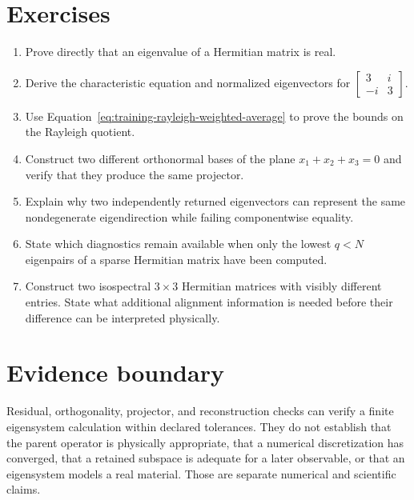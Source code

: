 \section{Exercises}

\begin{enumerate}
  \item Prove directly that an eigenvalue of a Hermitian matrix is real.
  \item Derive the characteristic equation and normalized eigenvectors for
        \(\begin{bmatrix}3&i\\-i&3\end{bmatrix}\).
  \item Use Equation~\eqref{eq:training-rayleigh-weighted-average} to prove the
        bounds on the Rayleigh quotient.
  \item Construct two different orthonormal bases of the plane
        \(x_1+x_2+x_3=0\) and verify that they produce the same projector.
  \item Explain why two independently returned eigenvectors can represent the
        same nondegenerate eigendirection while failing componentwise equality.
  \item State which diagnostics remain available when only the lowest \(q<N\)
        eigenpairs of a sparse Hermitian matrix have been computed.
  \item Construct two isospectral \(3\times3\) Hermitian matrices with visibly
        different entries. State what additional alignment information is
        needed before their difference can be interpreted physically.
\end{enumerate}

\section{Evidence boundary}

Residual, orthogonality, projector, and reconstruction checks can verify a
finite eigensystem calculation within declared tolerances. They do not
establish that the parent operator is physically appropriate, that a numerical
discretization has converged, that a retained subspace is adequate for a later
observable, or that an eigensystem models a real material. Those are separate
numerical and scientific claims.
